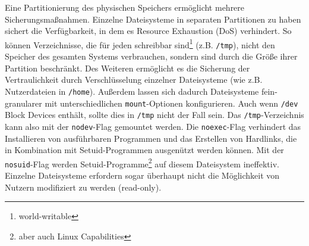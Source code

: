Eine Partitionierung des physischen Speichers ermöglicht mehrere Sicherungsmaßnahmen.
Einzelne Dateisysteme in separaten Partitionen zu haben sichert die Verfügbarkeit, in dem es Resource Exhaustion (DoS) verhindert. So können Verzeichnisse, die für jeden schreibbar sind\footnote{world-writable} (z.B. \texttt{/tmp}), nicht den Speicher des gesamten Systems verbrauchen, sondern sind durch die Größe ihrer Partition beschränkt.
Des Weiteren ermöglicht es die Sicherung der Vertraulichkeit durch Verschlüsselung einzelner Dateisysteme (wie z.B. Nutzerdateien in \texttt{/home}).
Außerdem lassen sich dadurch Dateisysteme fein-granularer mit unterschiedlichen \texttt{mount}-Optionen konfigurieren. Auch wenn \texttt{/dev} Block Devices enthält, sollte dies in \texttt{/tmp} nicht der Fall sein. Das \texttt{/tmp}-Verzeichnis kann also mit der \texttt{nodev}-Flag gemountet werden. Die \texttt{noexec}-Flag verhindert das Installieren von ausführbaren Programmen und das Erstellen von Hardlinks, die in Kombination mit Setuid-Programmen ausgenützt werden können. Mit
der \texttt{nosuid}-Flag werden Setuid-Programme\footnote{aber auch Linux Capabilities} auf diesem Dateisystem ineffektiv. Einzelne Dateisysteme erfordern sogar überhaupt nicht die Möglichkeit von Nutzern modifiziert zu werden (read-only). \cite{cis}

\begin{table}[H]
\centering
{}
\end{table}





